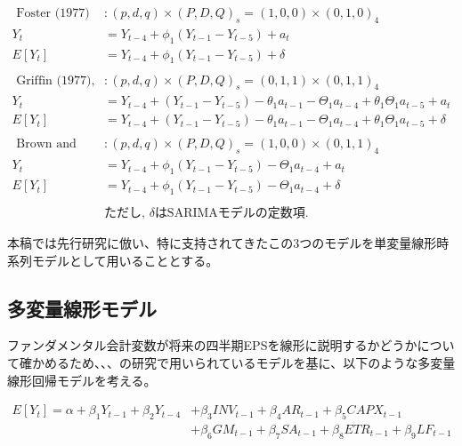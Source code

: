 \documentclass[a4paper, 12pt]{jsreport}
\begin{document}
\begin{equation}
  \begin{split}
    \text{ Foster (1977) } &: (p, d, q) \times (P, D, Q)_s = (1, 0, 0) \times (0, 1, 0)_4 \\
    Y_t &= Y_{t-4} + \phi_1(Y_{t-1} - Y_{t-5}) + a_t \\
    E[Y_t] &= Y_{t-4} + \phi_1(Y_{t-1} - Y_{t-5}) + \delta \\
    \\
    \text{ Griffin (1977), Watts (1975) } &: (p, d, q) \times (P, D, Q)_s = (0, 1, 1) \times (0, 1, 1)_4 \\
    Y_t &= Y_{t-4} + (Y_{t-1} - Y_{t-5}) - \theta_1a_{t-1} - \Theta_1a_{t-4} + \theta_1\Theta_1a_{t-5} + a_t \\
    E[Y_t] &= Y_{t-4} + (Y_{t-1} - Y_{t-5}) - \theta_1a_{t-1} - \Theta_1a_{t-4} + \theta_1\Theta_1a_{t-5} + \delta \\
    \\
    \text{ Brown and Rozeff (1979) } &: (p, d, q) \times (P, D, Q)_s = (1, 0, 0) \times (0, 1, 1)_4 \\
    Y_t &= Y_{t-4} + \phi_1(Y_{t-1}-Y_{t-5}) - \Theta_1a_{t-4} + a_t \\
    E[Y_t] &= Y_{t-4} + \phi_1(Y_{t-1}-Y_{t-5}) - \Theta_1a_{t-4} + \delta \\
    \\
    & \text{ただし, }\delta\text{はSARIMAモデルの定数項.}
  \end{split}
\end{equation}

本稿では先行研究に倣い、特に支持されてきたこの3つのモデルを単変量線形時系列モデルとして用いることとする。

\subsection{多変量線形モデル}

ファンダメンタル会計変数が将来の四半期EPSを線形に説明するかどうかについて確かめるため、\cite*{lev1993fundamental}、\cite*{abarbanell1997fundamental}、\cite*{lorek1996multivariate}の研究で用いられているモデルを基に、以下のような多変量線形回帰モデルを考える。

\begin{equation}
  \begin{split}
    \label{mlm1}
    E[Y_t] = \alpha + \beta_1Y_{t-1} + \beta_2Y_{t-4} 
    &+ \beta_3INV_{t-1} + \beta_4AR_{t-1} + \beta_5CAPX_{t-1} \\
    &+ \beta_6GM_{t-1} + \beta_7SA_{t-1} + \beta_8ETR_{t-1} + \beta_9LF_{t-1} \\
  \end{split}
\end{equation}
\end{document}
